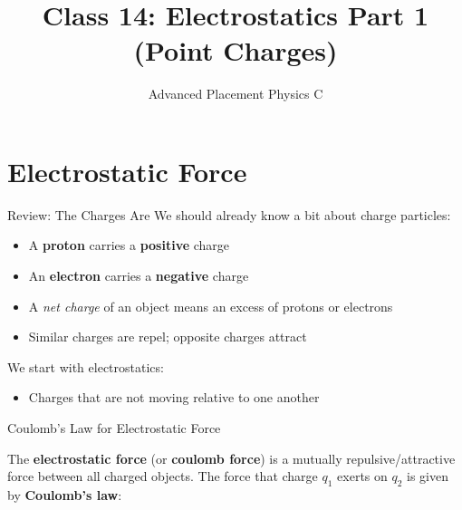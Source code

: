 \documentclass[12pt,aspectratio=169]{beamer}
\title{Class 14: Electrostatics Part 1 (Point Charges)}
\subtitle{Advanced Placement Physics C}
\begin{document}
\begin{frame}
  \maketitle
\end{frame}


\section{Electrostatic Force}

\begin{frame}{Review: The Charges Are}
  We should already know a bit about charge particles:
  \begin{itemize}
  \item A \textbf{proton} carries a \textbf{positive} charge
  \item An \textbf{electron} carries a \textbf{negative} charge
  \item A \emph{net charge} of an object means an excess of protons or electrons
  \item Similar charges are repel; opposite charges attract
  \end{itemize}

  \vspace{.2in}We start with electrostatics:
  \begin{itemize}
  \item Charges that are not moving relative to one another
  \end{itemize}
\end{frame}



\begin{frame}{Coulomb's Law for Electrostatic Force}
  \begin{center}
  \end{center}
  The \textbf{electrostatic force} (or \textbf{coulomb force}) is a mutually
  repulsive/attractive force between all charged objects. The force that charge
  $q_1$ exerts on $q_2$ is given by \textbf{Coulomb's law}:

\end{frame}
\end{document}
